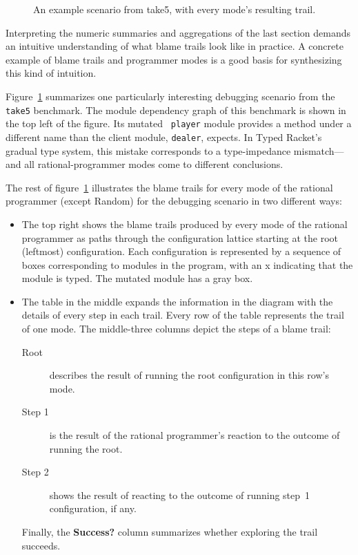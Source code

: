 
\begin{figure}

\caption{An example scenario from take5, with every mode's resulting trail.}
\label{fig:example-trails}
\end{figure}

Interpreting the numeric summaries and aggregations of the last section demands
an intuitive understanding of what blame trails look like in practice.  A
concrete example of blame trails and programmer modes is a good basis for
synthesizing this kind of intuition.

Figure~\ref{fig:example-trails} summarizes one particularly interesting
debugging scenario from the {\tt take5} benchmark. The module dependency graph
of this benchmark is shown in the top left of the figure. Its mutated {\tt
player} module provides a method under a different name than the client module,
{\tt dealer}, expects. In Typed Racket's gradual type system, this mistake
corresponds to a type-impedance mismatch---and all rational-programmer modes
come to different conclusions. 

The rest of figure~\ref{fig:example-trails} illustrates the blame trails for
every mode of the rational programmer (except Random) for the debugging scenario
in two different ways:
\begin{itemize}

\item The top right shows the blame trails produced by every mode of the rational programmer as paths through the configuration lattice starting at the
root (leftmost) configuration. Each configuration is represented by a sequence of boxes corresponding to modules in the program, with an x indicating that the module is typed.
The mutated module has a gray box.

\item The table in the middle expands the information in the diagram with the details of every step in each trail.
Every row of the table represents the trail of one mode. The middle-three columns depict the steps of a blame trail:
\begin{description}
\item[Root] describes the result of running the root configuration in this row's mode.
\item[Step 1] is the result of the rational programmer's reaction to the outcome of running the root. 
\item[Step 2] shows the result of reacting to the outcome of running step~1 configuration, if any. 
\end{description}
Finally, the \textbf{Success?} column summarizes whether exploring the trail succeeds.

\end{itemize}

